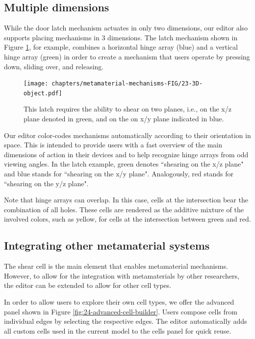 \subsection{Multiple dimensions}
While the door latch mechanism actuates in only two dimensions, our editor also supports placing mechanisms in 3 dimensions. The latch mechanism shown in Figure \ref{fig:23-3D-object}, for example, combines a horizontal hinge array (blue) and a vertical hinge array (green) in order to create a mechanism that users operate by pressing down, sliding over, and releasing. 

\begin{figure} [h]
    \texttt{[image: chapters/metamaterial-mechanisms-FIG/23-3D-object.pdf]}
    \caption[Short figure name.]{This latch requires the ability to shear on two planes, i.e., on the x/z plane denoted in green, and on the on x/y plane indicated in blue.
    \label{fig:23-3D-object}}
\end{figure}

Our editor color-codes mechanisms automatically according to their orientation in space. This is intended to provide users with a fast overview of the main dimensions of action in their devices and to help recognize hinge arrays from odd viewing angles. In the latch example, green denotes ``shearing on the x/z plane" and blue stands for ``shearing on the x/y plane". Analogously, red stands for ``shearing on the y/z plane".

Note that hinge arrays can overlap. In this case, cells at the intersection bear the combination of all holes. These cells are rendered as the additive mixture of the involved colors, such as yellow, for cells at the intersection between green and red.


\subsection{Integrating other metamaterial systems}

The shear cell is the main element that enables metamaterial mechanisms. However, to allow for the integration with metamaterials by other researchers, the editor can be extended to allow for other cell types. 

In order to allow users to explore their own cell types, we offer the advanced panel shown in Figure \ref{fig:24-advanced-cell-builder}. Users compose cells from individual edges by selecting the respective edges. The editor automatically adds all custom cells used in the current model to the cells panel for quick reuse. 


